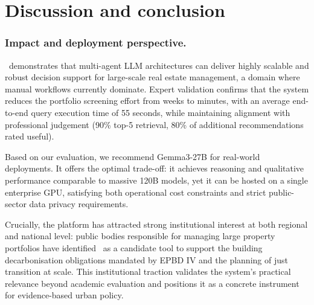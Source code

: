 \documentclass[runningheads,orivec]{llncs}
\begin{document}
\section{Discussion and conclusion}
\label{sec:limitations}
\label{sec:discussion}
\label{sec:conclusion}

\subsubsection{Impact and deployment perspective.}
\methodACR\ demonstrates that multi-agent LLM architectures can deliver highly scalable and robust decision support for large-scale real estate management, a domain where manual workflows currently dominate. Expert validation confirms that the system reduces the portfolio screening effort from weeks to minutes, with an average end-to-end query execution time of 55 seconds, while maintaining alignment with professional judgement (90\% top-5 retrieval, 80\% of additional recommendations rated useful). 

Based on our evaluation, we recommend Gemma3-27B for real-world deployments. It offers the optimal trade-off: it achieves reasoning and qualitative performance comparable to massive 120B models, yet it can be hosted on a single enterprise GPU, satisfying both operational cost constraints and strict public-sector data privacy requirements.

Crucially, the platform has attracted strong institutional interest at both regional and national level: public bodies responsible for managing large property portfolios have identified \methodACR \ as a candidate tool to support the building decarbonisation obligations mandated by EPBD IV and the planning of just transition at scale. 
This institutional traction validates the system's practical relevance beyond academic evaluation and positions it as a concrete instrument for evidence-based urban policy. \\
\end{document}
